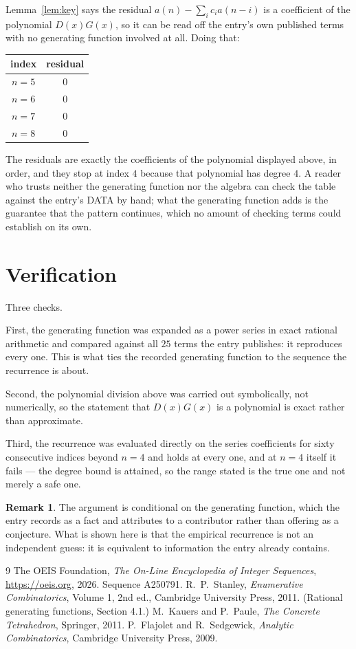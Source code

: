\documentclass[11pt,a4paper]{article}
\theoremstyle{plain}
\theoremstyle{definition}
\newtheorem{remark}[theorem]{Remark}
\begin{document}
Lemma~\ref{lem:key} says the residual $a(n)-\sum_ic_ia(n-i)$ is a coefficient of the
polynomial $D(x)G(x)$, so it can be read off the entry's own published terms with no
generating function involved at all. Doing that:
\begin{center}
\begin{tabular}{cc}
index & residual \\ \hline
$n=5$ & $0$ \\
$n=6$ & $0$ \\
$n=7$ & $0$ \\
$n=8$ & $0$
\end{tabular}
\end{center}
The residuals are exactly the coefficients of the polynomial displayed above, in order, and
they stop at index $4$ because that polynomial has degree $4$. A reader who trusts
neither the generating function nor the algebra can check the table against the entry's DATA
by hand; what the generating function adds is the guarantee that the pattern continues, which
no amount of checking terms could establish on its own.

\section{Verification}

Three checks.

First, the generating function was expanded as a power series in exact rational arithmetic and
compared against all $25$ terms the entry publishes: it reproduces every one. This is
what ties the recorded generating function to the sequence the recurrence is about.

Second, the polynomial division above was carried out symbolically, not numerically, so the
statement that $D(x)G(x)$ is a polynomial is exact rather than approximate.

Third, the recurrence was evaluated directly on the series coefficients for sixty consecutive
indices beyond $n=4$ and holds at every one, and at $n=4$ itself it fails --- the
degree bound is attained, so the range stated is the true one and not merely a safe one.

\begin{remark}
The argument is conditional on the generating function, which the entry records as a fact and
attributes to a contributor rather than offering as a conjecture. What is shown here is that
the empirical recurrence is not an independent guess: it is equivalent to information the
entry already contains.
\end{remark}

\begin{thebibliography}{9}
 The OEIS Foundation, \emph{The On-Line Encyclopedia of Integer
Sequences}, \url{https://oeis.org}, 2026. Sequence A250791.
 R.~P.~Stanley, \emph{Enumerative Combinatorics}, Volume 1, 2nd ed.,
Cambridge University Press, 2011. (Rational generating functions, Section 4.1.)
 M.~Kauers and P.~Paule, \emph{The Concrete Tetrahedron}, Springer, 2011.
 P.~Flajolet and R.~Sedgewick, \emph{Analytic Combinatorics}, Cambridge
University Press, 2009.
\end{thebibliography}
\end{document}
